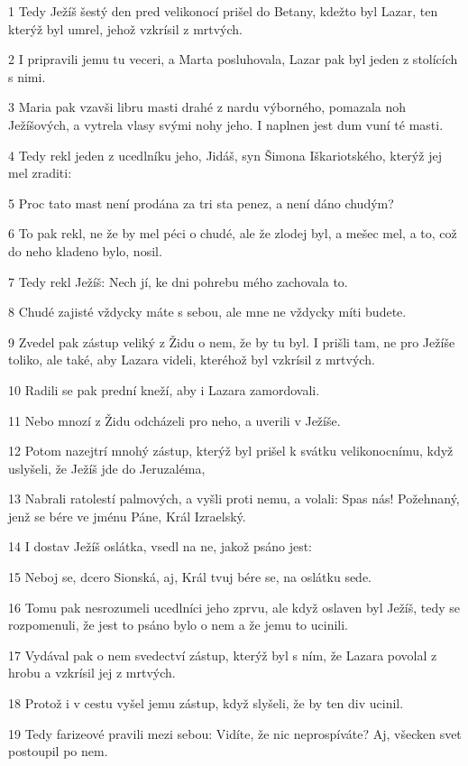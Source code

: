 \par 1 Tedy Ježíš šestý den pred velikonocí prišel do Betany, kdežto byl Lazar, ten kterýž byl umrel, jehož vzkrísil z mrtvých.
\par 2 I pripravili jemu tu veceri, a Marta posluhovala, Lazar pak byl jeden z stolících s nimi.
\par 3 Maria pak vzavši libru masti drahé z nardu výborného, pomazala noh Ježíšových, a vytrela vlasy svými nohy jeho. I naplnen jest dum vuní té masti.
\par 4 Tedy rekl jeden z ucedlníku jeho, Jidáš, syn Šimona Iškariotského, kterýž jej mel zraditi:
\par 5 Proc tato mast není prodána za tri sta penez, a není dáno chudým?
\par 6 To pak rekl, ne že by mel péci o chudé, ale že zlodej byl, a mešec mel, a to, což do neho kladeno bylo, nosil.
\par 7 Tedy rekl Ježíš: Nech jí, ke dni pohrebu mého zachovala to.
\par 8 Chudé zajisté vždycky máte s sebou, ale mne ne vždycky míti budete.
\par 9 Zvedel pak zástup veliký z Židu o nem, že by tu byl. I prišli tam, ne pro Ježíše toliko, ale také, aby Lazara videli, kteréhož byl vzkrísil z mrtvých.
\par 10 Radili se pak prední kneží, aby i Lazara zamordovali.
\par 11 Nebo mnozí z Židu odcházeli pro neho, a uverili v Ježíše.
\par 12 Potom nazejtrí mnohý zástup, kterýž byl prišel k svátku velikonocnímu, když uslyšeli, že Ježíš jde do Jeruzaléma,
\par 13 Nabrali ratolestí palmových, a vyšli proti nemu, a volali: Spas nás! Požehnaný, jenž se bére ve jménu Páne, Král Izraelský.
\par 14 I dostav Ježíš oslátka, vsedl na ne, jakož psáno jest:
\par 15 Neboj se, dcero Sionská, aj, Král tvuj bére se, na oslátku sede.
\par 16 Tomu pak nesrozumeli ucedlníci jeho zprvu, ale když oslaven byl Ježíš, tedy se rozpomenuli, že jest to psáno bylo o nem a že jemu to ucinili.
\par 17 Vydával pak o nem svedectví zástup, kterýž byl s ním, že Lazara povolal z hrobu a vzkrísil jej z mrtvých.
\par 18 Protož i v cestu vyšel jemu zástup, když slyšeli, že by ten div ucinil.
\par 19 Tedy farizeové pravili mezi sebou: Vidíte, že nic neprospíváte? Aj, všecken svet postoupil po nem.
